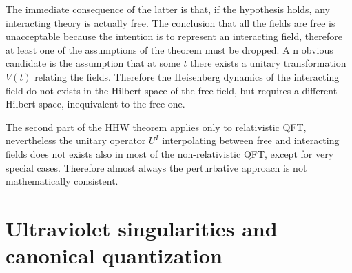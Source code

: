 \documentclass[../main/main.tex]{subfiles}
\begin{document}
The immediate consequence of the latter is that, if the hypothesis holds, any interacting theory is actually free. The conclusion that all the fields are free is unacceptable because the intention is to represent an interacting field, therefore at least one of the assumptions of the theorem must be dropped. A n obvious candidate is the assumption that at some $t$ there exists a unitary transformation $V(t)$ relating the fields. Therefore the Heisenberg dynamics of the interacting field do not exists in the Hilbert space of the free field, but requires a different Hilbert space, inequivalent to the free one.  


The second part of the HHW theorem applies only to relativistic QFT, nevertheless the unitary operator $U^I$ interpolating between free and interacting fields does not exists also in most of the non-relativistic QFT, except for very special cases. Therefore almost always the perturbative approach is not mathematically consistent. 

\section{Ultraviolet singularities and canonical quantization}

\cite[Section 2.4]{Strocchi_2013}\\
\end{document}
